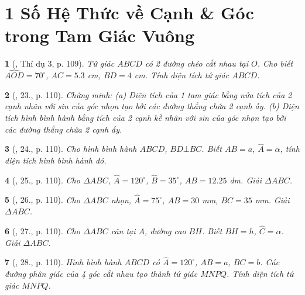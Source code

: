 \documentclass{article}
\newtheorem{baitoan}{}
\begin{document}

\section{1 Số Hệ Thức về Cạnh \& Góc trong Tam Giác Vuông}

\begin{baitoan}[\cite{Tuyen_Toan_9_old}, Thí dụ 3, p. 109]
	Tứ giác $ABCD$ có 2 đường chéo cắt nhau tại $O$. Cho biết $\widehat{AOD} = 70^\circ$, $AC = 5.3$ \emph{cm}, $BD = 4$ \emph{cm}. Tính diện tích tứ giác $ABCD$.
\end{baitoan}

\begin{baitoan}[\cite{Tuyen_Toan_9_old}, 23., p. 110]
	Chứng minh: (a) Diện tích của 1 tam giác bằng nửa tích của 2 cạnh nhân với sin của góc nhọn tạo bởi các đường thẳng chứa 2 cạnh ấy. (b) Diện tích hình bình hành bằng tích của 2 cạnh kề nhân với sin của góc nhọn tạo bởi các đường thẳng chứa 2 cạnh ấy.
\end{baitoan}

\begin{baitoan}[\cite{Tuyen_Toan_9_old}, 24., p. 110]
	Cho hình bình hành $ABCD$, $BD\bot BC$. Biết $AB = a$, $\widehat{A} = \alpha$, tính diện tích hình bình hành đó.
\end{baitoan}

\begin{baitoan}[\cite{Tuyen_Toan_9_old}, 25., p. 110]
	Cho $\Delta ABC$, $\widehat{A} = 120^\circ$, $\widehat{B} = 35^\circ$, $AB = 12.25$ \emph{dm}. Giải $\Delta ABC$.
\end{baitoan}

\begin{baitoan}[\cite{Tuyen_Toan_9_old}, 26., p. 110]
	Cho $\Delta ABC$ nhọn, $\widehat{A} = 75^\circ$, $AB = 30$ \emph{mm}, $BC = 35$ \emph{mm}. Giải $\Delta ABC$.
\end{baitoan}

\begin{baitoan}[\cite{Tuyen_Toan_9_old}, 27., p. 110]
	Cho $\Delta ABC$ cân tại $A$, đường cao $BH$. Biết $BH = h$, $\widehat{C} = \alpha$. Giải $\Delta ABC$.
\end{baitoan}

\begin{baitoan}[\cite{Tuyen_Toan_9_old}, 28., p. 110]
	Hình bình hành $ABCD$ có $\widehat{A} = 120^\circ$, $AB = a$, $BC = b$. Các đường phân giác của 4 góc cắt nhau tạo thành tứ giác $MNPQ$. Tính diện tích tứ giác $MNPQ$.
\end{baitoan}
\end{document}
